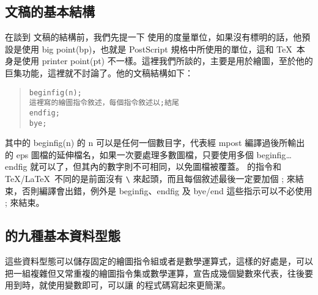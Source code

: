 \subsection{\MP{} 文稿的基本結構}

在談到 \MP{} 文稿的結構前，我們先提一下 \MP{} 使用的度量單位，如果沒有標明的話，他預設是使用 big point(bp)，也就是 {\sc PostScript} 規格中所使用的單位，這和 \TeX\ 本身是使用 printer point(pt) 不一樣。這裡我們所談的，主要是用於繪圖，至於他的巨集功能，這裡就不討論了。他的文稿結構如下：

\begin{quote}
  \begin{alltt}
    % 和 \TeX\ 一樣，註解是使用百分號
    beginfig(n);
    這裡寫 \MP{} 的繪圖指令敘述，每個指令敘述以 ; 結尾
    endfig;
    bye;   % 這一行可以不必 ;。這是通知 mpost 程式跳出，結束繪圖，end 亦可。
  \end{alltt}
\end{quote}

其中的 {\ttfamily beginfig(n)} 的 {\ttfamily n} 可以是任何一個數目字，代表經 {\ttfamily mpost} 編譯過後所輸出的 eps 圖檔的延伸檔名，如果一次要處理多數圖檔，只要使用多個 {\ttfamily beginfig}\dots{}{\ttfamily endfig} 就可以了，但其內的數字則不可相同，以免圖檔被覆蓋。\MP{} 的指令和 \TeX/\LaTeX\ 不同的是前面沒有 \verb|\| 來起頭，而且每個敘述最後一定要加個 {\ttfamily ;} 來結束，否則編譯會出錯，例外是 {\ttfamily beginfig}、{\ttfamily endfig} 及 {\ttfamily bye/end} 這些指示可以不必使用 {\ttfamily ;} 來結束。

\subsection{\MP{} 的九種基本資料型態}

這些資料型態可以儲存固定的繪圖指令組或者是數學運算式，這樣的好處是，可以把一組複雜但又常重複的繪圖指令集或數學運算，宣告成幾個變數來代表，往後要用到時，就使用變數即可，可以讓 \MP{} 的程式碼寫起來更簡潔。

